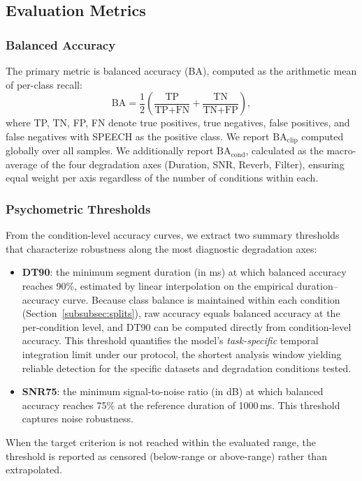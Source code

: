 \documentclass[11pt,a4paper]{article}
\begin{document}
\subsection{Evaluation Metrics}
\label{subsec:metrics}

\subsubsection{Balanced Accuracy}
\label{subsubsec:balanced_acc}

The primary metric is balanced accuracy (BA), computed as the arithmetic mean of per-class recall:
\begin{equation}
\text{BA} = \frac{1}{2} \left( \frac{\text{TP}}{\text{TP} + \text{FN}} + \frac{\text{TN}}{\text{TN} + \text{FP}} \right),
\end{equation}
where TP, TN, FP, FN denote true positives, true negatives, false positives, and false negatives with SPEECH as the positive class. We report $\text{BA}_{\text{clip}}$ computed globally over all samples. We additionally report $\text{BA}_{\text{cond}}$, calculated as the macro-average of the four degradation axes (Duration, SNR, Reverb, Filter), ensuring equal weight per axis regardless of the number of conditions within each.

\subsubsection{Psychometric Thresholds}
\label{subsubsec:thresholds}

From the condition-level accuracy curves, we extract two summary thresholds that characterize robustness along the most diagnostic degradation axes:
\begin{itemize}[leftmargin=*]
    \item \textbf{DT90}: the minimum segment duration (in ms) at which balanced accuracy reaches 90\%, estimated by linear interpolation on the empirical duration--accuracy curve. Because class balance is maintained within each condition (Section~\ref{subsubsec:splits}), raw accuracy equals balanced accuracy at the per-condition level, and DT90 can be computed directly from condition-level accuracy. This threshold quantifies the model's \emph{task-specific} temporal integration limit under our protocol, the shortest analysis window yielding reliable detection for the specific datasets and degradation conditions tested.
    \item \textbf{SNR75}: the minimum signal-to-noise ratio (in dB) at which balanced accuracy reaches 75\% at the reference duration of 1000\,ms. This threshold captures noise robustness.
\end{itemize}
When the target criterion is not reached within the evaluated range, the threshold is reported as censored (below-range or above-range) rather than extrapolated.
\end{document}
